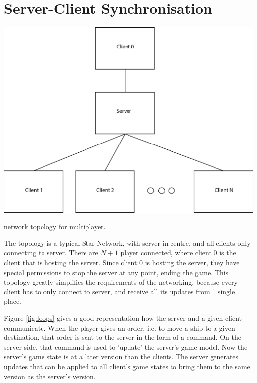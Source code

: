 
\section{Server-Client Synchronisation}

\newcommand{\stepOneName}{lockstep}
\newcommand{\stepTwoName}{simple server client}
\newcommand{\stepThreeName}{server client with simulation}

\begin{marginfigure}
	\includegraphics{res/computer_communication_architecture/NetworkTopology.png}
	\caption{
	network topology for multiplayer.
	}
	\label{fig:serverClientSychNetworkTopology}
\end{marginfigure}

The topology is a typical Star Network, with server in centre, and all clients only connecting to server.
There are $N+1$ player connected, where client 0 is the client that is hosting the server.
Since client 0 is hosting the server, they have special permissions to stop the server at any point, ending the game.
This topology greatly simplifies the requirements of the networking, because every client has to only connect to server, and receive all its updates from 1 single place. 

Figure \ref{fig:loops} gives a good representation how the server and a given client communicate.
When the player gives an order, i.e. to move a ship to a given destination, that order is sent to the server in the form of a command.
On the server side, that command is used to 'update' the server's game model. Now the server's game state is at a later version than the clients. The server generates updates that can be applied to all client's game states to bring them to the same version as the server's version.

